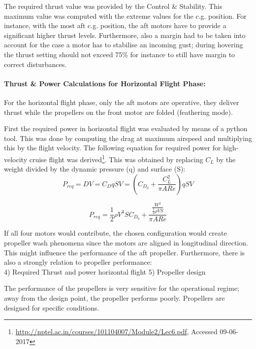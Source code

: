 The required thrust value was provided by the Control \& Stability. This maximum value was computed with the extreme values for the c.g. position. For instance, with the most aft c.g. position, the aft motors have to provide a significant higher thrust levels. Furthermore, also a margin had to be taken into account for the case a motor has to stabilise an incoming gust; during hovering the thrust setting should not exceed 75\% for instance to still have margin to correct disturbances.\\

\paragraph{Thrust \& Power Calculations for Horizontal Flight Phase:} For the horizontal flight phase, only the aft motors are operative, they deliver thrust while the propellers on the front motor are folded (feathering mode). 

First the required power in horizontal flight was evaluated by means of a python tool. This was done by computing the drag at maximum airspeed and multiplying this by the flight velocity. The following equation for required power for high-velocity cruise flight was derived\footnote{\url{http://nptel.ac.in/courses/101104007/Module2/Lec6.pdf}, Accessed 09-06-2017}. This was obtained by replacing $C_{L}$ by the weight divided by the dynamic pressure (q) and surface (S):
\begin{equation*}
    P_{req} = D V = C_{D} q S V = (C_{D_{0}} + \frac{C_{L}^{2}}{\pi AR e}) q S V
\end{equation*}

\begin{equation}
    P_{req} = \frac{1}{2} \rho V^{3} S C_{D_{0}} + \frac{\frac{W^{2}}{\frac{1}{2} \rho V S}}{\pi AR e}
\end{equation}


If all four motors would contribute, the chosen configuration would create propeller wash phenomena since the motors are aligned in longitudinal direction. This might influence the performance of the aft propeller. Furthermore, there is also a strongly relation to propeller performance: \\

4) Required Thrust and power horizontal flight
5) Propeller design

The performance of the propellers is very sensitive for the operational regime; away from the design point, the propeller performs poorly. Propellers are designed for specific conditions. 

